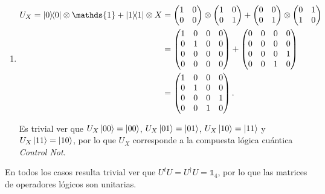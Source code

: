 \documentclass{scrartcl}
\DeclareRobustCommand{\[}{\begin{equation}}
\DeclareRobustCommand{\]}{\end{equation}}
\begin{document}
\begin{enumerate}
\begin{enumerate}
        
        \item
        \begin{align}
            U_X = \dyad{0}{0} \otimes \mathds{1} + \dyad{1}{1} \otimes X &=
            \begin{pmatrix}
                1 & 0 \\
                0 & 0
            \end{pmatrix}
            \otimes
            \begin{pmatrix}
                \mqty{\pmat{0}}
            \end{pmatrix}
            +
            \begin{pmatrix}
                0 & 0 \\
                0 & 1
            \end{pmatrix}
            \otimes
            \begin{pmatrix}
                \mqty{\pmat{1}}
            \end{pmatrix} \\
            &=
            \begin{pmatrix}
                \mqty{\mqty{\pmat{0}} & \mqty{\zmat{2}{2}} \\ \mqty{\zmat{2}{2}} & \mqty{\zmat{2}{2}}}
            \end{pmatrix}
            +
            \begin{pmatrix}
                \mqty{\mqty{\zmat{2}{2}} & \mqty{\zmat{2}{2}} \\ \mqty{\zmat{2}{2}} & \mqty{\pmat{1}}}
            \end{pmatrix} \\
            &=
            \begin{pmatrix}
                \mqty{\mqty{\pmat{0}} & \mqty{\zmat{2}{2}} \\ \mqty{\zmat{2}{2}} & \mqty{\pmat{1}}}
            \end{pmatrix}.
        \end{align}
        
        Es trivial ver que $U_X \ket{00} = \ket{00}$, $U_X \ket{01} = \ket{01}$, $U_X \ket{10} = \ket{11}$ y $U_X \ket{11} = \ket{10}$, por lo que $U_X$ corresponde a la compuesta lógica cuántica \textit{Control Not}.
    \end{enumerate}
    
    En todos los casos resulta trivial ver que $U^t U = U^\dagger U = \mathds{1}_4$, por lo que las matrices de operadores lógicos son unitarias.
    

\end{enumerate}
\end{document}
